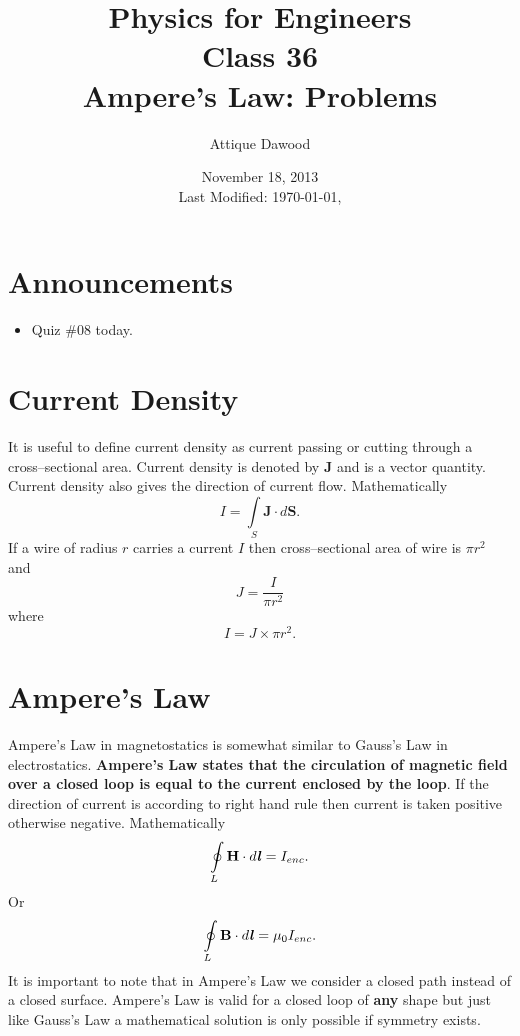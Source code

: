 \documentclass[12pt,a4paper]{article}
\title{\vspace{-3cm}Physics for Engineers\\Class 36\\Ampere's Law: Problems}
\author{Attique Dawood}
\date{November 18, 2013\\[0.2cm] Last Modified: \today, \currenttime}
\begin{document}
\maketitle
\section{Announcements}
\begin{itemize}
\item Quiz \#08 today.
\end{itemize}
\section{Current Density}
It is useful to define current density as current passing or cutting through a cross--sectional area. Current density is denoted by \textbf{J} and is a vector quantity. Current density also gives the direction of current flow. Mathematically
\begin{equation}
I=\int\limits_{S}\textbf{J}\cdot d{\textbf{S}}.
\end{equation}
If a wire of radius $r$ carries a current $I$ then cross--sectional area of wire is $\pi r^2$ and
\begin{equation}
J=\dfrac{I}{\pi r^2}
\end{equation}
where
\begin{equation}
I=J\times\pi r^2.
\end{equation}
\section{Ampere's Law}
Ampere's Law in magnetostatics is somewhat similar to Gauss's Law in electrostatics. \textbf{Ampere's Law states that the circulation of magnetic field over a closed loop is equal to the current enclosed by the loop}. If the direction of current is according to right hand rule then current is taken positive otherwise negative. Mathematically
\begin{equation}
\oint\limits_{L}\textbf{H}\cdot d\textbf{\textit{l}}=I_{enc}.
\end{equation}
Or
\begin{equation}
\oint\limits_{L}\textbf{B}\cdot d\textbf{\textit{l}}=\mu_0I_{enc}.
\end{equation}
It is important to note that in Ampere's Law we consider a closed path instead of a closed surface. Ampere's Law is valid for a closed loop of \textbf{any} shape but just like Gauss's Law a mathematical solution is only possible if symmetry exists.
\end{document}
